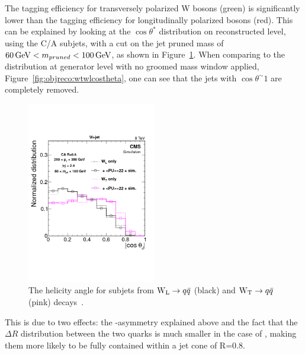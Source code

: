 The tagging efficiency for transversely polarized W bosons (green) is significantly lower than the tagging efficiency for longitudinally polarized bosons (red). This can be explained by looking at the  $\cos \theta^*$ distribution on reconstructed level, using the C/A subjets, with a cut on the jet pruned mass of $60 \,\text{Ge\hspace{-.08em}V} < m_{pruned} < 100 \,\text{Ge\hspace{-.08em}V}$, as shown in Figure~\ref{fig:objreco:wtwlcostheta_reco}. When comparing to the distribution at generator level with no groomed mass window applied, Figure~\ref{fig:objreco:wtwlcostheta}, one can see that the \PWT jets with $\cos \theta^ \sim 1$ are completely removed.
\begin{figure}[h!] 
    \centering 
    \includegraphics[width=0.5\textwidth]{figures/event_reconstruction/s1vs2-600_sjCosTheta_afterMass.pdf}
     \caption{The helicity angle for subjets from $\mathrm{W}_{\mathrm{L}}\rightarrow q\bar{q}$ (black) and $\mathrm{W}_{\mathrm{T}}\rightarrow q\bar{q}$ (pink) decays~\cite{Khachatryan:2014vla}.}
     \label{fig:objreco:wtwlcostheta_reco}
 \end{figure}
 This is due to two effects: the \PT-asymmetry explained above and the fact that the $\Delta R$ distribution between the two quarks is much smaller in the case of \PWL, making them more likely to be fully contained within a jet cone of R=0.8.

\clearpage
